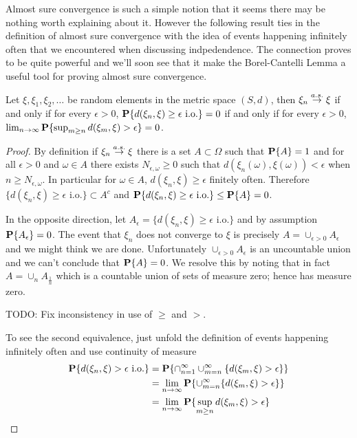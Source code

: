 Almost sure convergence is such a simple notion that it seems there
may be nothing worth explaining about it.  However the following
result ties in the definition of almost sure convergence with the
idea of events happening infinitely often that we encountered when
discussing indpedendence.  The connection proves to be quite powerful
and we'll soon see that it make the Borel-Cantelli Lemma a useful tool
for proving almost sure convergence.
\begin{lem}\label{ConvergenceAlmostSureByInfinitelyOften}Let $\xi, \xi_1, \xi_2, \dots$ be random elements in the
  metric space $(S,d)$, then $\xi_n \overset{a.s.}\to \xi$ if
and only if for every $\epsilon > 0$, $\textbf{P}\{d(\xi_n, \xi) \geq
  \epsilon \text{ i.o.}\}=0$ if and only if for every $\epsilon > 0$,
$\lim_{n \to \infty} \textbf{P}\{\sup_{m \geq n} d(\xi_m, \xi) > \epsilon\}
= 0$.  
\end{lem}
\begin{proof}
By definition if $\xi_n \overset{a.s.}\to \xi$ there is a set $A \subset \Omega$
such that $\textbf{P}\{A\} = 1$ and for all $\epsilon > 0$ and $\omega \in A$ there
exists $N_{\epsilon, \omega}\geq 0$ such that $d(\xi_n(\omega), \xi(\omega)) <
\epsilon$ when $n \geq
N_{\epsilon, \omega}$.  In particular for $\omega \in A$, $d(\xi_n, \xi) \geq
  \epsilon$ finitely often.  Therefore $\lbrace d(\xi_n, \xi) \geq
  \epsilon \text{ i.o.} \rbrace \subset A^c$ and $\textbf{P}\{d(\xi_n, \xi) \geq
  \epsilon \text{ i.o.}\} \leq \textbf{P}\{A\} = 0$.

In the opposite direction, let $A_\epsilon = \lbrace d(\xi_n, \xi) \geq
  \epsilon \text{ i.o.}\rbrace$ and by assumption
  $\textbf{P}\{A_\epsilon\} = 0$.  The event that $\xi_n$ does not
  converge to $\xi$ is precisely $A = \cup_{\epsilon > 0} A_\epsilon$
  and we might think we are done.  Unfortunately $\cup_{\epsilon > 0}
  A_\epsilon$ is an uncountable union and we can't conclude that
  $\textbf{P}\{A\} = 0$.  
  We resolve this by noting that in fact $A = \cup_n A_{\frac{1}{n}}$
  which is a countable union of sets of measure zero; hence has
  measure zero.

TODO: Fix inconsistency in use of $\geq$ and $>$.

To see the second equivalence, just unfold the definition of events
happening infinitely often and use continuity of measure
\begin{align*}
\textbf{P}\{d(\xi_n, \xi) >
  \epsilon \text{ i.o.}\} &= \textbf{P}\{\cap_{n=1}^\infty
  \cup_{m=n}^\infty \lbrace d(\xi_m, \xi) >
  \epsilon\rbrace \} \\
&= \lim_{n \to \infty} \textbf{P}\{\cup_{m=n}^\infty \lbrace d(\xi_m, \xi) >
  \epsilon \rbrace \} \\
&= \lim_{n \to \infty} \textbf{P}\{\sup_{m \geq n} d(\xi_m, \xi) >
  \epsilon\} \\
\end{align*}
\end{proof}

